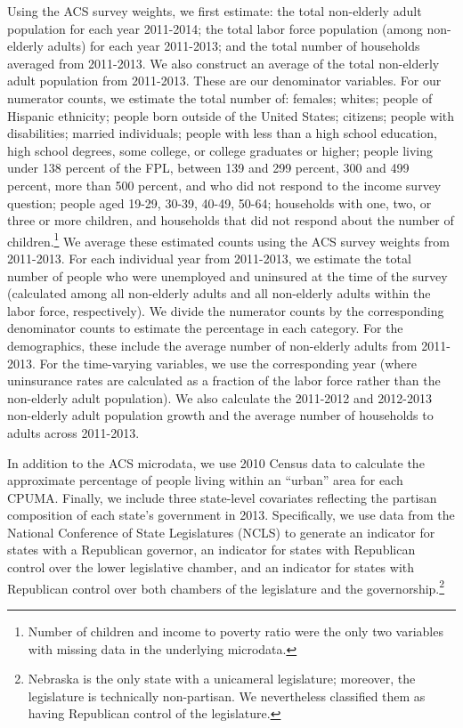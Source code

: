 \documentclass{article}
\begin{document}
Using the ACS survey weights, we first estimate: the total non-elderly adult population for each year 2011-2014; the total labor force population (among non-elderly adults) for each year 2011-2013; and the total number of households averaged from 2011-2013. We also construct an average of the total non-elderly adult population from 2011-2013. These are our denominator variables. For our numerator counts, we estimate the total number of: females; whites; people of Hispanic ethnicity; people born outside of the United States; citizens; people with disabilities; married individuals; people with less than a high school education, high school degrees, some college, or college graduates or higher; people living under 138 percent of the FPL, between 139 and 299 percent, 300 and 499 percent, more than 500 percent, and who did not respond to the income survey question; people aged 19-29, 30-39, 40-49, 50-64; households with one, two, or three or more children, and households that did not respond about the number of children.\footnote{Number of children and income to poverty ratio were the only two variables with missing data in the underlying microdata.} We average these estimated counts using the ACS survey weights from 2011-2013. For each individual year from 2011-2013, we estimate the total number of people who were unemployed and uninsured at the time of the survey (calculated among all non-elderly adults and all non-elderly adults within the labor force, respectively). We divide the numerator counts by the corresponding denominator counts to estimate the percentage in each category. For the demographics, these include the average number of non-elderly adults from 2011-2013. For the time-varying variables, we use the corresponding year (where uninsurance rates are calculated as a fraction of the labor force rather than the non-elderly adult population). We also calculate the 2011-2012 and 2012-2013 non-elderly adult population growth and the average number of households to adults across 2011-2013. 

In addition to the ACS microdata, we use 2010 Census data to calculate the approximate percentage of people living within an ``urban'' area for each CPUMA. Finally, we include three state-level covariates reflecting the partisan composition of each state's government in 2013. Specifically, we use data from the National Conference of State Legislatures (NCLS) to generate an indicator for states with a Republican governor, an indicator for states with Republican control over the lower legislative chamber, and an indicator for states with Republican control over both chambers of the legislature and the governorship.\footnote{Nebraska is the only state with a unicameral legislature; moreover, the legislature is technically non-partisan. We nevertheless classified them as having Republican control of the legislature.} 
\end{document}

